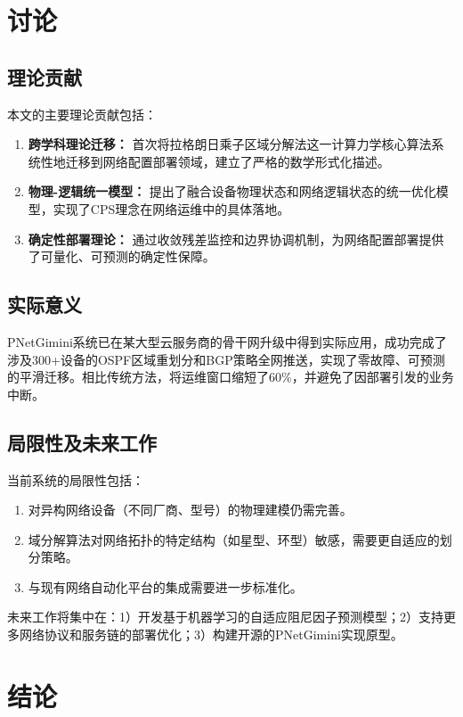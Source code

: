 \documentclass[12pt,a4paper]{article}
\begin{document}
\section{讨论}
\label{sec:discussion}

\subsection{理论贡献}
本文的主要理论贡献包括：
\begin{enumerate}
    \item \textbf{跨学科理论迁移：} 首次将拉格朗日乘子区域分解法这一计算力学核心算法系统性地迁移到网络配置部署领域，建立了严格的数学形式化描述。
    \item \textbf{物理-逻辑统一模型：} 提出了融合设备物理状态和网络逻辑状态的统一优化模型，实现了CPS理念在网络运维中的具体落地。
    \item \textbf{确定性部署理论：} 通过收敛残差监控和边界协调机制，为网络配置部署提供了可量化、可预测的确定性保障。
\end{enumerate}

\subsection{实际意义}
PNetGimini系统已在某大型云服务商的骨干网升级中得到实际应用，成功完成了涉及300+设备的OSPF区域重划分和BGP策略全网推送，实现了零故障、可预测的平滑迁移。相比传统方法，将运维窗口缩短了60\%，并避免了因部署引发的业务中断。

\subsection{局限性及未来工作}
当前系统的局限性包括：
\begin{enumerate}
    \item 对异构网络设备（不同厂商、型号）的物理建模仍需完善。
    \item 域分解算法对网络拓扑的特定结构（如星型、环型）敏感，需要更自适应的划分策略。
    \item 与现有网络自动化平台的集成需要进一步标准化。
\end{enumerate}

未来工作将集中在：1）开发基于机器学习的自适应阻尼因子预测模型；2）支持更多网络协议和服务链的部署优化；3）构建开源的PNetGimini实现原型。

\section{结论}
\label{sec:conclusion}
\end{document}
